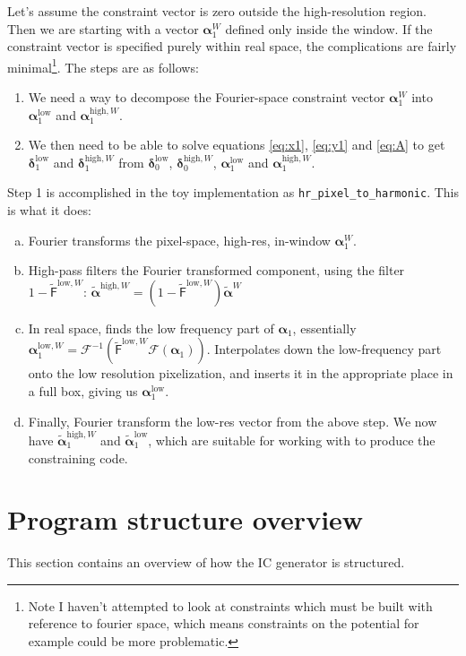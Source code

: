 \documentclass[11pt,a4paper,preprint]{aastex}
\newcommand{\low}{\mathrm{low}}
\newcommand{\high}{\mathrm{high}}
\newcommand{\bmath}[1]{\ensuremath{\bm{#1}}}
\renewcommand{\vec}[1]{\bmath{#1}}
\begin{document}
Let's assume the constraint vector is zero outside the high-resolution region.
Then we are starting with a vector $\vec{\alpha}_1^W$ defined only inside the window.
If the constraint vector is specified purely within real space, the complications
are fairly minimal\footnote{Note I haven't attempted to look at constraints which must
be built with reference to fourier space, which means constraints on the potential for
example could be more problematic.}. The steps are as follows:
\begin{enumerate}
    \item We need a way to decompose the Fourier-space constraint vector
 $\vec{\alpha}_1^W$ into $\vec{\alpha}_1^{\low}$ and $\vec{\alpha}_1^{\high,W}$.
    \item We then need to be able
to solve equations \ref{eq:x1}, \ref{eq:y1} and \ref{eq:A} to get $\vec{\delta}_1^{\low}$ and
$\vec{\delta}_1^{\high,W}$ from $\vec{\delta}_0^{\low}$,
$\vec{\delta}_0^{\high,W}$, $\vec{\alpha}_1^{\low}$ and
$\vec{\alpha}_1^{\high,W}$.
\end{enumerate}
Step 1 is accomplished in the toy implementation as {\tt hr\_pixel\_to\_harmonic}.
This is what it does:
\begin{enumerate}[(a)]
    \item Fourier transforms the pixel-space, high-res, in-window $\vec{\alpha}^W_1$.
    \item High-pass filters the Fourier transformed component, using the filter $1-\tilde{\mathsf{F}}^{\low,W}$:
      $\tilde{\vec{\alpha}}^{\high,W} = (1-\tilde{\mathsf{F}}^{\low,W}) \tilde{\vec{\alpha}}^W$
    \item In real space, finds the low frequency part of $\vec{\alpha}_1$, essentially
      $\vec{\alpha}_1^{\low,W} = \mathcal{F}^{-1}(\tilde{\mathsf{F}}^{\low,W}\mathcal{F}(\vec{\alpha}_1))$.
    Interpolates down the low-frequency part onto the low resolution pixelization,
        and inserts it in the appropriate place in a full box, giving us
        $\vec{\alpha}_1^{\low}$.

    \item Finally, Fourier transform the low-res vector from the above step.
     We now have $\tilde{\vec{\alpha}}_1^{\high,W}$ and
        $\tilde{\vec{\alpha}}_1^{\low}$, which are suitable for working with to produce
        the constraining code.
\end{enumerate}



\section{Program structure overview}

This section contains an overview of how the IC generator is structured.
\end{document}
